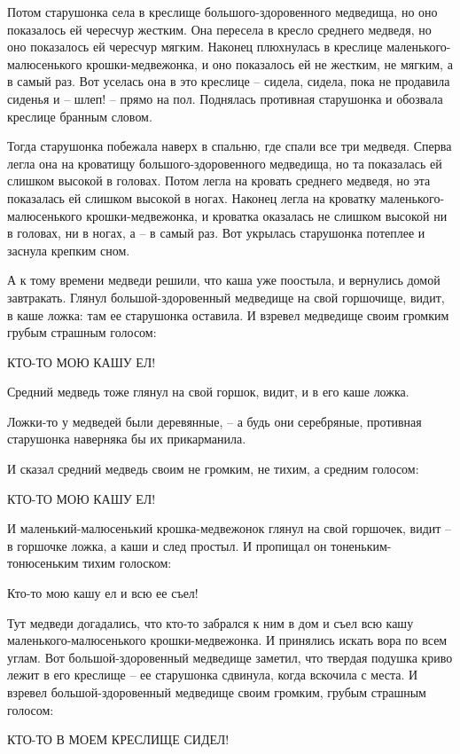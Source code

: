 Потом старушонка села в креслище большого-здоровенного медведища, но оно показалось ей чересчур жестким. Она пересела в кресло среднего медведя, но оно показалось ей чересчур мягким. Наконец плюхнулась в креслице маленького-малюсенького крошки-медвежонка, и оно показалось ей не жестким, не мягким, а в самый раз. Вот уселась она в это креслице – сидела, сидела, пока не продавила сиденья и – шлеп! – прямо на пол. Поднялась противная старушонка и обозвала креслице бранным словом.

Тогда старушонка побежала наверх в спальню, где спали все три медведя. Сперва легла она на кроватищу большого-здоровенного медведища, но та показалась ей слишком высокой в головах. Потом легла на кровать среднего медведя, но эта показалась ей слишком высокой в ногах. Наконец легла на кроватку маленького-малюсенького крошки-медвежонка, и кроватка оказалась не слишком высокой ни в головах, ни в ногах, а – в самый раз. Вот укрылась старушонка потеплее и заснула крепким сном.

А к тому времени медведи решили, что каша уже поостыла, и вернулись домой завтракать. Глянул большой-здоровенный медведище на свой горшочище, видит, в каше ложка: там ее старушонка оставила. И взревел медведище своим громким грубым страшным голосом:

КТО-ТО МОЮ КАШУ ЕЛ!

Средний медведь тоже глянул на свой горшок, видит, и в его каше ложка.

Ложки-то у медведей были деревянные, – а будь они серебряные, противная старушонка наверняка бы их прикарманила.

И сказал средний медведь своим не громким, не тихим, а средним голосом:

КТО-ТО МОЮ КАШУ ЕЛ!

И маленький-малюсенький крошка-медвежонок глянул на свой горшочек, видит – в горшочке ложка, а каши и след простыл. И пропищал он тоненьким-тонюсеньким тихим голоском:

Кто-то мою кашу ел и всю ее съел!

Тут медведи догадались, что кто-то забрался к ним в дом и съел всю кашу маленького-малюсенького крошки-медвежонка. И принялись искать вора по всем углам. Вот большой-здоровенный медведище заметил, что твердая подушка криво лежит в его креслище – ее старушонка сдвинула, когда вскочила с места. И взревел большой-здоровенный медведище своим громким, грубым страшным голосом:

КТО-ТО В МОЕМ КРЕСЛИЩЕ СИДЕЛ!

